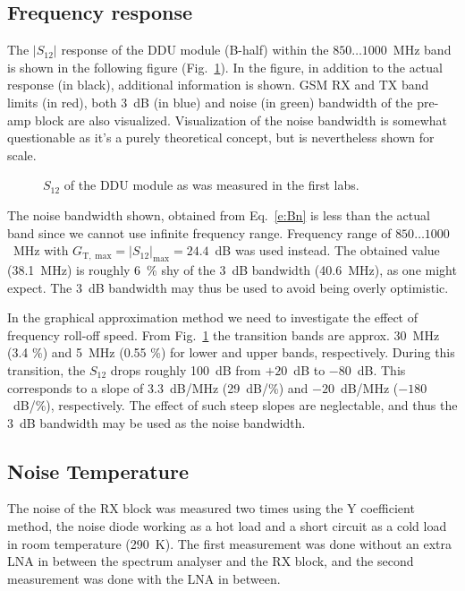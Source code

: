 \documentclass[a4paper, 12pt]{article}
\begin{document}
\newpage
\subsection{Frequency response}

The $|S_{12}|$ response of the DDU module (B-half) within the $850 \ldots 1000$~MHz band 
is shown in the following figure (Fig.~\ref{f:s12}). In the figure, in addition to the 
actual response (in black), additional information is shown. GSM RX and TX band limits 
(in red), both 3~dB (in blue) and noise (in green) bandwidth of the pre-amp block are also 
visualized. Visualization of the noise bandwidth is somewhat questionable as it's a purely 
theoretical concept, but is nevertheless shown for scale. 

\begin{figure}[h!]
	\begin{center}
	\caption{$S_{12}$ of the DDU module as was measured in the first labs.}
	\label{f:s12}
	\end{center}
	\vspace*{-12pt}
\end{figure}

The noise bandwidth shown, obtained from Eq.~\ref{e:Bn} is less than the actual band since 
we cannot use infinite frequency range. Frequency range of $850 \ldots 1000$~MHz with
$G_\mathrm{T,\;max} = |S_{12}|_\mathrm{max} = 24.4$~dB was used instead. The obtained 
value (38.1~MHz) is roughly 6~\% shy of the 3~dB bandwidth (40.6~MHz), as one might expect.
The 3~dB bandwidth may thus be used to avoid being overly optimistic.

In the graphical approximation method we need to investigate the effect of frequency 
roll-off speed. From Fig.~\ref{f:s12} the transition bands are approx. 30~MHz (3.4 \%) 
and 5~MHz (0.55 \%) for lower and upper bands, respectively. During this transition, 
the $S_{12}$ drops roughly 100~dB from $+20$~dB to $-80$~dB. This corresponds to a slope 
of $3.3$~dB/MHz (29~dB/\%) and $-20$~dB/MHz ($-180$~dB/\%), respectively. The effect of 
such steep slopes are neglectable, and thus the 3~dB bandwidth may be used as the noise 
bandwidth.


\subsection{Noise Temperature}

\noindent
The noise of the RX block was measured two times using the Y coefficient method, the noise diode
working as a hot load and a short circuit as a cold load in room temperature (290~K). The first 
measurement was done without an extra LNA in between the spectrum analyser and the RX block, and 
the second measurement was done with the LNA in between.
\end{document}
